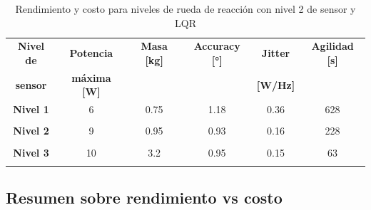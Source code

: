 \begin{table}[h!]
	\centering
	\caption{Rendimiento y costo para niveles de rueda de reacción con nivel 2 de sensor y LQR}
	\begin{tabular}{|c|c|c|c|c|c|}
		\hline
		\textbf{Nivel de}   & \textbf{Potencia} & \textbf{Masa [kg]} & \textbf{Accuracy [°]} & \textbf{Jitter} & \textbf{Agilidad [s]}  \\ 
		\textbf{sensor}  & \textbf{máxima [W]} & & & \textbf{[W/Hz]} &  \\
		\hline
		\textbf{Nivel 1}   & 6  & 0.75  & 1.18 & 0.36 & 628  \\
		&  &   &  &  &    \\
		\hline
		\textbf{Nivel 2}   & 9  & 0.95  & 0.93 & 0.16 & 228   \\
		& & & & &   \\
		\hline
		\textbf{Nivel 3}   & 10  & 3.2  & 0.95 & 0.15 & 63   \\
		& & & & &   \\
		\hline		
	\end{tabular}
	\label{tab:RW_LQR_actuadores}
\end{table}

\subsection{Resumen sobre rendimiento vs costo}